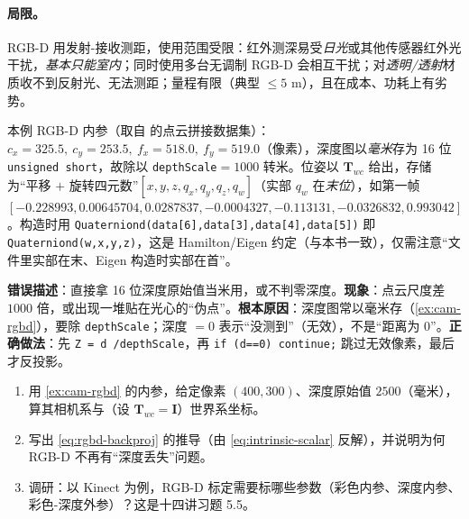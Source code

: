 \paragraph{局限。}
RGB-D 用发射-接收测距，使用范围受限\cite{gaoxiang2019slam14}：红外测深易受\emph{日光}或其他传感器红外光干扰，\emph{基本只能室内}；同时使用多台无调制 RGB-D 会相互干扰；对\emph{透明/透射}材质收不到反射光、无法测距；量程有限（典型 $\le5$ m\cite{carlone2026handbook}），且在成本、功耗上有劣势。

\begin{example}\label{ex:cam-rgbd}
本例 RGB-D 内参（取自\cite{gaoxiang2019slam14} 的点云拼接数据集）：$c_x=325.5,\ c_y=253.5,\ f_x=518.0,\ f_y=519.0$（像素），深度图以\emph{毫米}存为 16 位 \texttt{unsigned short}，故除以 \texttt{depthScale}$=1000$ 转米。位姿以 $\mathbf{T}_{wc}$ 给出，存储为“平移 $+$ 旋转四元数”$[x,y,z,q_x,q_y,q_z,q_w]$（实部 $q_w$ 在\emph{末位}），如第一帧 $[-0.228993,0.00645704,0.0287837,-0.0004327,-0.113131,-0.0326832,0.993042]$。构造时用 \texttt{Quaterniond(data[6],data[3],data[4],data[5])} 即 \texttt{Quaterniond(w,x,y,z)}，这是 Hamilton/Eigen 约定（与本书一致），仅需注意“文件里实部在末、Eigen 构造时实部在首”。
\end{example}

\begin{pitfall}
\textbf{错误描述}：直接拿 16 位深度原始值当米用，或不判零深度。\textbf{现象}：点云尺度差 $1000$ 倍，或出现一堆贴在光心的“伪点”。\textbf{根本原因}：深度图常以毫米存（\cref{ex:cam-rgbd}），要除 \texttt{depthScale}；深度 $=0$ 表示“没测到”（无效），不是“距离为 0”。\textbf{正确做法}：先 \texttt{Z = d /\allowbreak  depthScale}，再 \texttt{if (d==0) continue;} 跳过无效像素，最后才反投影。
\end{pitfall}

\begin{practice}
\begin{enumerate}
  \item 用 \cref{ex:cam-rgbd} 的内参，给定像素 $(400,300)$、深度原始值 $2500$（毫米），算其相机系与（设 $\mathbf{T}_{wc}=\mathbf{I}$）世界系坐标。
  \item 写出 \cref{eq:rgbd-backproj} 的推导（由 \cref{eq:intrinsic-scalar} 反解），并说明为何 RGB-D 不再有“深度丢失”问题。
  \item 调研：以 Kinect 为例，RGB-D 标定需要标哪些参数（彩色内参、深度内参、彩色-深度外参）？这是十四讲习题 5.5\cite{gaoxiang2019slam14}。
\end{enumerate}
\end{practice}

